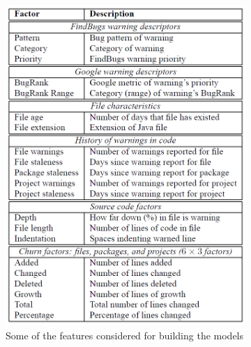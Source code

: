 \documentclass{article}
\begin{document}
 \begin{figure}[H]
     \begin{subfigure}{.5\textwidth}
         \centering
         \includegraphics[scale=0.3]{./src/actionable_warnings_metrics.png}
         \caption{Some of the features considered for building the models}\label{act:metrics}
     \end{subfigure}%
     \begin{subfigure}{.5\textwidth}
         \centering

\end{subfigure}
\end{figure}
\end{document}
